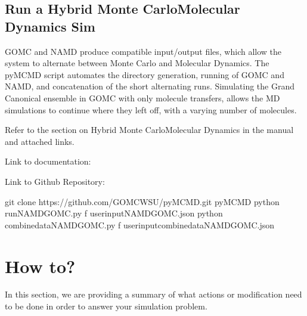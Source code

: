 \documentclass[letterpaper,10pt,english]{sphinxmanual}
\begin{document}
\section{Run a Hybrid Monte Carlo\sphinxhyphen{}Molecular Dynamics Sim}
\label{\detokenize{hybrid_MC_MD:run-a-hybrid-monte-carlo-molecular-dynamics-sim}}
\sphinxAtStartPar
GOMC and NAMD produce compatible input/output files, which allow the system to alternate between Monte Carlo and Molecular Dynamics.
The py\sphinxhyphen{}MCMD script automates the directory generation, running of GOMC and NAMD, and concatenation of the short alternating runs.
Simulating the Grand Canonical ensemble in GOMC with only molecule transfers, allows the MD simulations to continue where they left off, with a varying number of molecules.

\sphinxAtStartPar
Refer to the section on Hybrid Monte Carlo\sphinxhyphen{}Molecular Dynamics in the manual and attached links.

\sphinxAtStartPar
Link to documentation: 

\sphinxAtStartPar
Link to Github Repository: 

\begin{sphinxVerbatim}[commandchars=\\\{\}]
\PYGZdl{} git clone https://github.com/GOMC\PYGZhy{}WSU/py\PYGZhy{}MCMD.git
\PYGZdl{}  py\PYGZhy{}MCMD
\PYGZdl{} python run\PYGZus{}NAMD\PYGZus{}GOMC.py \PYGZhy{}f user\PYGZus{}input\PYGZus{}NAMD\PYGZus{}GOMC.json
\PYGZdl{} python combine\PYGZus{}data\PYGZus{}NAMD\PYGZus{}GOMC.py \PYGZhy{}f user\PYGZus{}input\PYGZus{}combine\PYGZus{}data\PYGZus{}NAMD\PYGZus{}GOMC.json
\end{sphinxVerbatim}


\chapter{How to?}
\label{\detokenize{howto:how-to}}\label{\detokenize{howto::doc}}
\sphinxAtStartPar
In this section, we are providing a summary of what actions or modification need to be done in order to answer your simulation problem.
\end{document}
